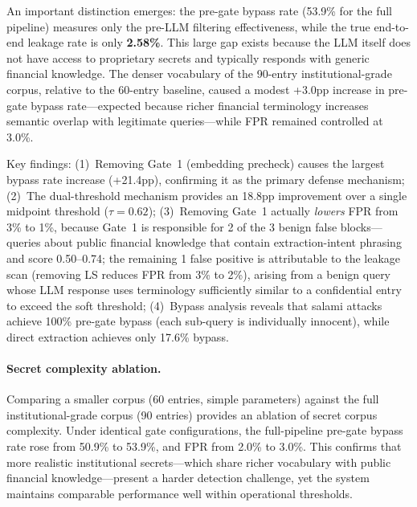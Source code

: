 \documentclass[journal]{IEEEtran}
\begin{document}
An important distinction emerges: the pre-gate bypass rate (53.9\% for the full pipeline) measures only the pre-LLM filtering effectiveness, while the true end-to-end leakage rate is only \textbf{2.58\%}. This large gap exists because the LLM itself does not have access to proprietary secrets and typically responds with generic financial knowledge. The denser vocabulary of the 90-entry institutional-grade corpus, relative to the 60-entry baseline, caused a modest +3.0pp increase in pre-gate bypass rate---expected because richer financial terminology increases semantic overlap with legitimate queries---while FPR remained controlled at 3.0\%.

Key findings: (1)~Removing Gate~1 (embedding precheck) causes the largest bypass rate increase (+21.4pp), confirming it as the primary defense mechanism; (2)~The dual-threshold mechanism provides an 18.8pp improvement over a single midpoint threshold ($\tau{=}0.62$); (3)~Removing Gate~1 actually \textit{lowers} FPR from 3\% to 1\%, because Gate~1 is responsible for 2 of the 3 benign false blocks---queries about public financial knowledge that contain extraction-intent phrasing and score 0.50--0.74; the remaining 1 false positive is attributable to the leakage scan (removing LS reduces FPR from 3\% to 2\%), arising from a benign query whose LLM response uses terminology sufficiently similar to a confidential entry to exceed the soft threshold; (4)~Bypass analysis reveals that salami attacks achieve 100\% pre-gate bypass (each sub-query is individually innocent), while direct extraction achieves only 17.6\% bypass.

\paragraph{Secret complexity ablation.} Comparing a smaller corpus (60 entries, simple parameters) against the full institutional-grade corpus (90 entries) provides an ablation of secret corpus complexity. Under identical gate configurations, the full-pipeline pre-gate bypass rate rose from 50.9\% to 53.9\%, and FPR from 2.0\% to 3.0\%. This confirms that more realistic institutional secrets---which share richer vocabulary with public financial knowledge---present a harder detection challenge, yet the system maintains comparable performance well within operational thresholds.
\end{document}
